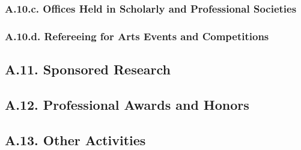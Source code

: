 \documentclass[12pt]{article}
\begin{document}
\subsubsection*{A.10.c. Offices Held in Scholarly and Professional Societies}

\subsubsection*{A.10.d. Refereeing for Arts Events and Competitions}


\subsection*{A.11. Sponsored Research}


\subsection*{A.12. Professional Awards and Honors}


\subsection*{A.13. Other Activities}
\end{document}
